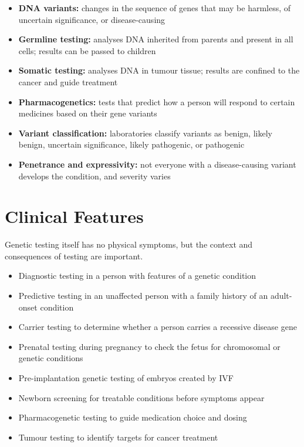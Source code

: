 \begin{itemize}
    \item \textbf{DNA variants:} changes in the sequence of genes that may be harmless, of uncertain significance, or disease-causing
    \item \textbf{Germline testing:} analyses DNA inherited from parents and present in all cells; results can be passed to children
    \item \textbf{Somatic testing:} analyses DNA in tumour tissue; results are confined to the cancer and guide treatment
    \item \textbf{Pharmacogenetics:} tests that predict how a person will respond to certain medicines based on their gene variants
    \item \textbf{Variant classification:} laboratories classify variants as benign, likely benign, uncertain significance, likely pathogenic, or pathogenic
    \item \textbf{Penetrance and expressivity:} not everyone with a disease-causing variant develops the condition, and severity varies
\end{itemize}

\section*{Clinical Features}
Genetic testing itself has no physical symptoms, but the context and consequences of testing are important.

\begin{itemize}
    \item Diagnostic testing in a person with features of a genetic condition
    \item Predictive testing in an unaffected person with a family history of an adult-onset condition
    \item Carrier testing to determine whether a person carries a recessive disease gene
    \item Prenatal testing during pregnancy to check the fetus for chromosomal or genetic conditions
    \item Pre-implantation genetic testing of embryos created by IVF
    \item Newborn screening for treatable conditions before symptoms appear
    \item Pharmacogenetic testing to guide medication choice and dosing
    \item Tumour testing to identify targets for cancer treatment
\end{itemize}


